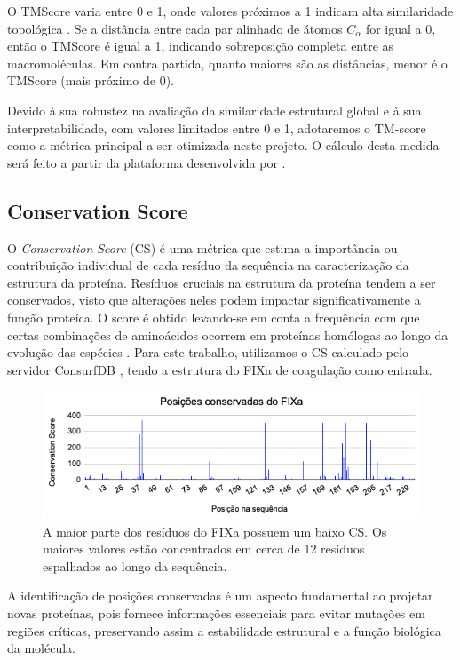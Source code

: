 O TMScore varia entre 0 e 1, onde valores próximos a 1 indicam alta similaridade topológica \cite{tmscore}.
Se a distância entre cada par alinhado de átomos \(C_\alpha\) for igual a 0, então o TMScore é igual a 1, indicando sobreposição completa 
entre as macromoléculas. Em contra partida, quanto maiores são as distâncias, menor é o TMScore (mais próximo de 0).

Devido à sua robustez na avaliação da similaridade estrutural global e à sua interpretabilidade,
com valores limitados entre 0 e 1, adotaremos o TM-score como a métrica principal a ser otimizada neste projeto.
O cálculo desta medida será feito a partir da plataforma desenvolvida por \cite{USalign}.


\subsection{Conservation Score}
\label{subsection:CS}
O \textit{Conservation Score} (CS) é uma métrica que estima a importância ou 
contribuição individual de cada resíduo da sequência na caracterização da estrutura da proteína.
Resíduos cruciais na estrutura da proteína tendem a ser conservados,
visto que alterações neles podem impactar significativamente a função proteíca. 
O score é obtido levando-se em conta a frequência com que certas combinações de aminoácidos 
ocorrem em proteínas homólogas ao longo da evolução das espécies \cite{Eddy}. 
Para este trabalho, utilizamos o CS calculado pelo servidor ConsurfDB \cite{ConsurfDB},
tendo a estrutura do FIXa de coagulação como entrada. 

\begin{figure}[H]
    \centering
    \includegraphics[width=.8\textwidth]{figuras/ConservationScore.png}
    \caption{A maior parte dos resíduos do FIXa possuem um baixo CS. Os maiores valores estão concentrados em cerca de 12 resíduos 
    espalhados ao longo da sequência.}
  \end{figure}

A identificação de posições conservadas é um aspecto fundamental ao projetar novas proteínas,
pois fornece informações essenciais para evitar mutações em regiões críticas,
preservando assim a estabilidade estrutural e a função biológica da molécula.

